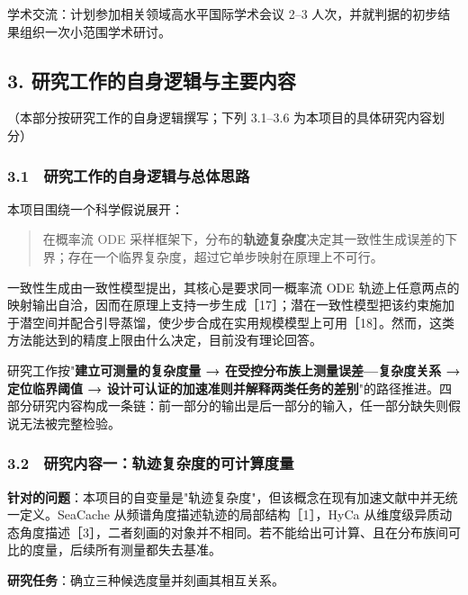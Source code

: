 \documentclass[12pt,a4paper]{ctexart}
\begin{document}
学术交流：计划参加相关领域高水平国际学术会议 2–3 人次，并就判据的初步结果组织一次小范围学术研讨。

\subsection*{3. 研究工作的自身逻辑与主要内容}

（本部分按研究工作的自身逻辑撰写；下列 3.1–3.6 为本项目的具体研究内容划分）

\subsubsection*{3.1　研究工作的自身逻辑与总体思路}

本项目围绕一个科学假说展开：

\begin{quote}\small
在概率流 ODE 采样框架下，分布的\textbf{轨迹复杂度}决定其一致性生成误差的下界；存在一个临界复杂度，超过它单步映射在原理上不可行。

\end{quote}

一致性生成由一致性模型提出，其核心是要求同一概率流 ODE 轨迹上任意两点的映射输出自洽，因而在原理上支持一步生成［17］；潜在一致性模型把该约束施加于潜空间并配合引导蒸馏，使少步合成在实用规模模型上可用［18］。然而，这类方法能达到的精度上限由什么决定，目前没有理论回答。

研究工作按"\textbf{建立可测量的复杂度量 → 在受控分布族上测量误差—复杂度关系 → 定位临界阈值 → 设计可认证的加速准则并解释两类任务的差别}"的路径推进。四部分研究内容构成一条链：前一部分的输出是后一部分的输入，任一部分缺失则假说无法被完整检验。

\subsubsection*{3.2　研究内容一：轨迹复杂度的可计算度量}

\textbf{针对的问题}：本项目的自变量是"轨迹复杂度"，但该概念在现有加速文献中并无统一定义。SeaCache 从频谱角度描述轨迹的局部结构［1］，HyCa 从维度级异质动态角度描述［3］，二者刻画的对象并不相同。若不能给出可计算、且在分布族间可比的度量，后续所有测量都失去基准。

\textbf{研究任务}：确立三种候选度量并刻画其相互关系。
\end{document}
